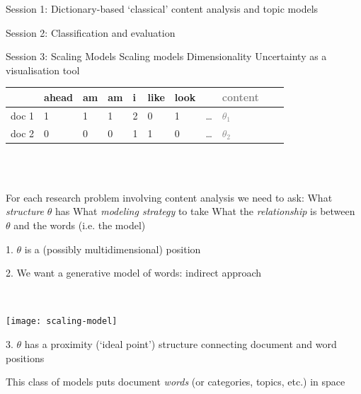 \documentclass{mediumfoils}
\author{\textbf{Will Lowe} University of Mannheim
\and
 \textbf{Sven-Oliver Proksch}\\McGill University}
\date{}
\begin{document}
\maketitle


Session 1: Dictionary-based `classical' content analysis and topic models

Session 2: Classification and evaluation

Session 3: 
\ita
\itm Scaling Models
\ita
\itm Scaling models
\itm Dimensionality
\itm Uncertainty
\itm as a visualisation tool
\itz
\itz


\begin{center}
\small
\begin{tabular}{rllllllllll}\toprule
        & ahead & am & am & i & like & look &  & \textcolor{gray}{content} \\ \midrule
doc 1  & 1     & 1  & 1  & 2 & 0    & 1    & \ldots & \textcolor{gray}{$\theta_1$} \\
doc 2  & 0     & 0  & 0  & 1 & 1    & 0    & \ldots & \textcolor{gray}{$\theta_2$} \\ \bottomrule
\end{tabular} 
\normalsize
\end{center}
~\\\

For each research problem involving content analysis we need to ask:
\ita
\itm What \textit{structure} $\theta$ has
\itm What \textit{modeling strategy} to take
\itm What the \textit{relationship} is between $\theta$ and the words (i.e. the model)
\itz


1. $\theta$ is a (possibly multidimensional) position

2. We want a generative model of words: indirect approach

~\\
\centerline{\texttt{[image: scaling-model]}}


3. $\theta$ has a proximity (`ideal point') structure connecting document and word positions


This class of models puts document \textit{words} (or categories, topics, etc.) in space
\end{document}

